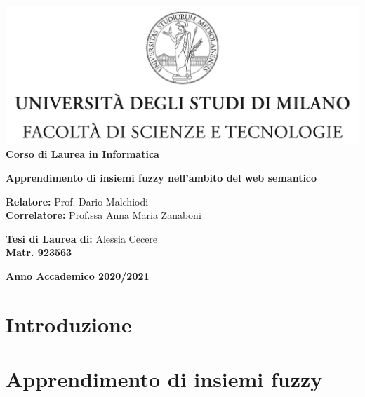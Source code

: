 \documentclass[12pt,a4paper]{report}
\begin{document}
\begin{titlepage}
\begin{center}
\includegraphics[width=\textwidth]{Logo.jpg}\\
{\large{\bf Corso di Laurea in Informatica}}
\end{center}
\vspace{12mm}
\begin{center}
{\huge{\bf Apprendimento di insiemi fuzzy nell'ambito del web semantico}}\\
\end{center}
\vspace{12mm}
\begin{flushleft}
{\large{\bf Relatore:}}
{\large{Prof. Dario Malchiodi}}\\
\vspace{4mm}
{\large{\bf Correlatore:}}
{\large{Prof.ssa Anna Maria Zanaboni}}\\
\end{flushleft}
\vspace{12mm}
\begin{flushright}
{\large{\bf Tesi di Laurea di:}}
{\large{Alessia Cecere}}\\
{\large{\bf Matr. 923563}}\\
\end{flushright}
\vspace{4mm}
\begin{center}
{\large{\bf Anno Accademico 2020/2021}}
\end{center}
\end{titlepage}


\tableofcontents


\chapter*{Introduzione}
\chapter{Apprendimento di insiemi fuzzy}
\end{document}
